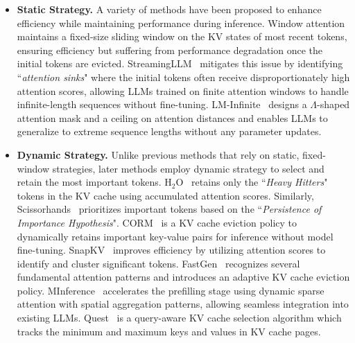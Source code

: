 \documentclass[11pt, a4paper, logo, copyright, nonumbering]{map}
\begin{document}
\begin{itemize}
    \item \textbf{Static Strategy.} A variety of methods have been proposed to enhance efficiency while maintaining performance during inference. Window attention~\cite{DBLP:journals/corr/abs-2004-05150, child2019generatinglongsequencessparse, jiang2023mistral7b} maintains a fixed-size sliding window on the KV states of most recent tokens, ensuring efficiency but suffering from performance degradation once the initial tokens are evicted. StreamingLLM~\cite{xiao2024efficientstreaminglanguagemodels} mitigates this issue by identifying ``\textit{attention sinks}" where the initial tokens often receive disproportionately high attention scores, allowing LLMs trained on finite attention windows to handle infinite-length sequences without fine-tuning. LM-Infinite~\cite{han-etal-2024-lm} designs a $\Lambda$-shaped attention mask and a ceiling on attention distances and enables LLMs to generalize to extreme sequence lengths without any parameter updates.
    \item \textbf{Dynamic Strategy.} Unlike previous methods that rely on static, fixed-window strategies, later methods employ dynamic strategy to select and retain the most important tokens. H$_2$O~\cite{NEURIPS2023_6ceefa7b} retains only the ``\textit{Heavy Hitters}" tokens in the KV cache using accumulated attention scores. Similarly, Scissorhands~\cite{NEURIPS2023_a452a7c6} prioritizes important tokens based on the ``\textit{Persistence of Importance Hypothesis}". CORM~\cite{dai2024cormcacheoptimizationrecent} is a KV cache eviction policy to dynamically retains important key-value pairs for inference without model fine-tuning. SnapKV~\cite{li2024snapkvllmknowslooking} improves efficiency by utilizing attention scores to identify and cluster significant tokens. FastGen~\cite{ge2024model} recognizes several fundamental attention patterns and introduces an adaptive KV cache eviction policy. MInference~\cite{NEURIPS2024_5dfbe6f5} accelerates the prefilling stage using dynamic sparse attention with spatial aggregation patterns, allowing seamless integration into existing LLMs. Quest~\cite{pmlr-v235-tang24l} is a query-aware KV cache selection algorithm which tracks the minimum and maximum keys and values in KV cache pages.

\end{itemize}
\end{document}
